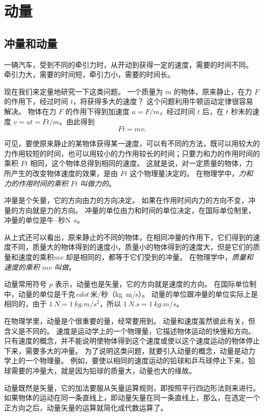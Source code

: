\chapter{动量}\label{chp:momentum}
\section{冲量和动量}
一辆汽车，受到不同的牵引力时，从开动到获得一定的速度，需要的时间不同。
牵引力大，需要的时间短，牵引力小，需要的时间长。

现在我们来定量地研究一下这类问题。
一个质量为 $m$ 的物体，原来静止，在力 $F$ 的作用下，经过时间 $t$，将获得多大的速度？
这个问题利用牛顿运动定律很容易解决。
物体在力 $F$ 的作用下得到加速度 $a=F/m$，经过时间 $t$ 后，在 $t$ 秒末的速度 $v=at=Ft/m$。由此得到
\[Ft=mv.\]

可见，要使原来静止的某物体获得某一速度，可以有不同的方法，既可以用较大的力作用较短的时间，也可以用较小的力作用较长的时间；只要力和力的作用时间的乘积 $Ft$ 相同，这个物体总得到相同的速度。
这就是说，对一定质量的物体，力所产生的改变物体速度的效果，是由 $Ft$ 这个物理量决定的。
在物理学中，\emph{力和力的作用时间的乘积 $Ft$ 叫做力的}。

冲量是个矢量，它的方向由力的方向决定。
如果在作用时间内力的方向不变，冲量的方向就是力的方向。
冲量的单位由力和时间的单位决定，在国际单位制里，冲量的单位是牛\,$\cdot$\,秒{\unit{N.s}}。

从上式还可以看出，原来静止的不同的物体，在相同冲量的作用下，它们得到的速度不同，质量大的物体得到的速度小，质量小的物体得到的速度大，但是它们的质量和速度的乘积$mv$ 却是相同的，都等于它们受到的冲量。
在物理学中，\emph{质量和速度的乘积 $mv$ 叫做}。

动量常用符号 $p$ 表示，动量也是矢量，它的方向就是速度的方向。
在国际单位制中，动量的单位是千克\,$cdot$\,米/秒（\unit{kg.m/s}）。
动量的单位跟冲量的单位实际上是相同的，由于 $\qty{1}{N}=\qty{1}{kg.m/s^2}$，所以 $\qty{1}{N.s}=\qty{1}{kg.m/s}$。

在物理学里，动量是个很重要的量，经常要用到。
动量和速度虽然彼此有关，但含义是不同的。
速度是运动学上的一个物理量，它描述物体运动的快慢和方向。
只有速度的概念，并不能说明使物体得到这个速度或使以这个速度运动的物体停止下来，需要多大的冲量。
为了说明这类问题，就要引入动量的概念，动量是动力学上的一个物理量。
例如，要使以相同的速度运动的铅球和乒乓球停止下来，铅球需要的冲量大，就是因为铅球的质量大，动量也大的缘故。

动量既然是矢量，它的加法要服从矢量运算规则，即按照平行四边形法则来进行。
如果物体的运动在同一条直线上，即动量矢量在同一条直线上，那么，在选定一个正方向之后，动量矢量的运算就简化成代数运算了。

